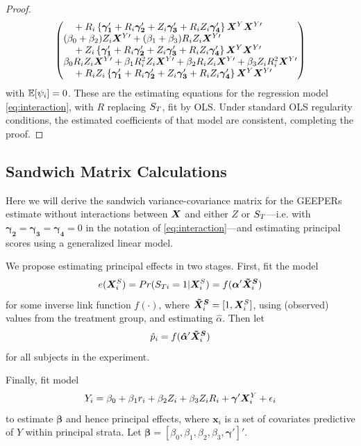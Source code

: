 \documentclass{statsoc} %
\begin{document}
\begin{proof}
\begin{equation*}
\begin{split}
\begin{pmatrix*}[l]
    \quad {}+\ri\left\{\bm{\gamma_1}'+R_i\bm{\gamma_2}'+Z_i\bm{\gamma_3}'+R_iZ_i\bm{\gamma_4}'\right\}\bxy\bxyt\\
        (\beta_0+\beta_2)Z_i\bxyt+(\beta_1+\beta_3)R_iZ_i\bxyt\\
    \quad {}+Z_i\left\{\bm{\gamma_1}'+R_i\bm{\gamma_2}'+Z_i\bm{\gamma_3}'+R_iZ_i\bm{\gamma_4}'\right\}\bxy\bxyt\\
\beta_0\ri Z_i\bxyt+\beta_1R_i^2Z_i\bxyt+\beta_2\ri Z_i\bxyt+\beta_3Z_iR_i^2\bxyt\\
    \quad {}+\ri Z_i\left\{\bm{\gamma_1}'+R_i\bm{\gamma_2}'+Z_i\bm{\gamma_3}'+R_iZ_i\bm{\gamma_4}'\right\}\bxy\bxyt\\
  \end{pmatrix*}
  \end{split}
\end{equation*}
with $\mathbb{E}[\psi_i]=0$.
These are the estimating equations for the regression model \eqref{eq:interaction}, with $R$ replacing $S_T$, fit by OLS. 
Under standard OLS regularity conditions, the estimated coefficients of that model are consistent, completing the proof.  
\end{proof}

\subsection{Sandwich Matrix Calculations}

Here we will derive the sandwich variance-covariance matrix for the GEEPERs estimate without interactions between $\bm{X}$ and either $Z$ or $S_T$---i.e. with $\bm{\gamma_2}=\bm{\gamma_3}=\bm{\gamma_4}=0$ in the notation of \eqref{eq:interaction}---and estimating principal scores using a generalized linear model. 

We propose estimating principal effects in two stages.
First, fit the model
\begin{equation}\label{eq:psMod}
  e(\bm{X}^S_i)=Pr(S_{Ti}=1|\bm{X}^S_i)=f(\bm{\alpha}'\bm{\tilde{X}^S}_i)
\end{equation}
for some inverse link function $f(\cdot)$, where $\bm{\tilde{X}^S}_i=[1,\bm{X}^S_i]$, using (observed) values from the treatment group, and estimating $\hat{\alpha}$.
Then let
\begin{equation}\label{eq:ps}
  \hat{p}_i=f(\bm{\hat{\alpha}}'\bm{\tilde{X}^S}_i)
\end{equation}
for all subjects in the experiment.

Finally, fit model
\begin{equation}\label{eq:regression}
  Y_i=\beta_0+\beta_1r_i+\beta_2Z_i+\beta_3Z_iR_i+\bm{\gamma}'\bm{X}^Y_i+\epsilon_i
\end{equation}
to estimate $\bm{\beta}$ and hence principal effects, where $\bm{x}_i$ is a set of covariates predictive of $Y$ within principal strata.
Let $\bm{\beta}=[\beta_0,\beta_1,\beta_2,\beta_3,\bm{\gamma}']'$.
\end{document}
